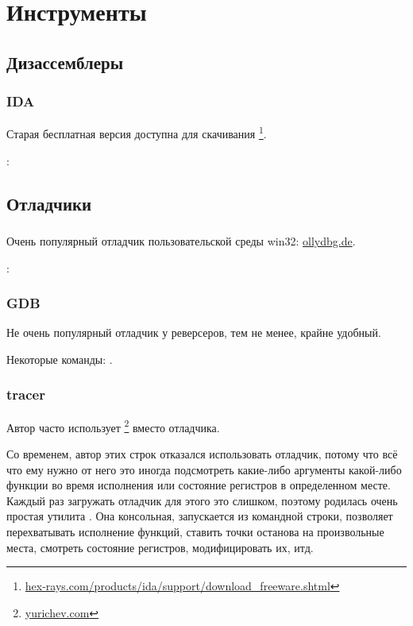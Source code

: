 \chapter{Инструменты}

\section{Дизассемблеры}

\subsection{IDA}

\label{IDA}
Старая бесплатная версия доступна для скачивания
\footnote{\href{http://go.yurichev.com/17031}{hex-rays.com/products/ida/support/download\_freeware.shtml}}.

\ShortHotKeyCheatsheet: 

\section{Отладчики}

\subsection{\olly}
\myindex{\olly}

Очень популярный отладчик пользовательской среды win32: \href{http://go.yurichev.com/17032}{ollydbg.de}.

\ShortHotKeyCheatsheet: 

\subsection{GDB}

Не очень популярный отладчик у реверсеров, тем не менее, крайне удобный.

Некоторые команды: .

\subsection{tracer}

\label{tracer}
Автор часто использует 
\footnote{\href{http://go.yurichev.com/17339}{yurichev.com}}
вместо отладчика.

Со временем, автор этих строк отказался использовать отладчик, потому что всё что ему нужно от него это иногда подсмотреть 
какие-либо аргументы какой-либо функции во время исполнения или состояние регистров в определенном месте. 
Каждый раз загружать отладчик для этого это слишком, поэтому родилась очень простая утилита . 
Она консольная, запускается из командной строки, позволяет перехватывать исполнение функций, 
ставить точки останова на произвольные места, смотреть состояние регистров, модифицировать их, итд.

